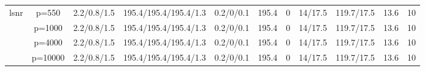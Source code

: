 \begin{table}[ht]
{\begin{tabular}{|c|c|ccccccccc|}
  \midrule\multirow{4}[2]{*}{lsnr} & p=550 & 2.2/0.8/1.5 & 195.4/195.4/195.4/1.3 & 0.2/0/0.1 & 195.4 & 0 & 14/17.5 & 119.7/17.5 & 13.6 & 10 \\ 
   & p=1000 & 2.2/0.8/1.5 & 195.4/195.4/195.4/1.3 & 0.2/0/0.1 & 195.4 & 0 & 14/17.5 & 119.7/17.5 & 13.6 & 10 \\ 
   & p=4000 & 2.2/0.8/1.5 & 195.4/195.4/195.4/1.3 & 0.2/0/0.1 & 195.4 & 0 & 14/17.5 & 119.7/17.5 & 13.6 & 10 \\ 
   & p=10000 & 2.2/0.8/1.5 & 195.4/195.4/195.4/1.3 & 0.2/0/0.1 & 195.4 & 0 & 14/17.5 & 119.7/17.5 & 13.6 & 10 \\ 
   \bottomrule 
\end{tabular}
}
\end{table}
